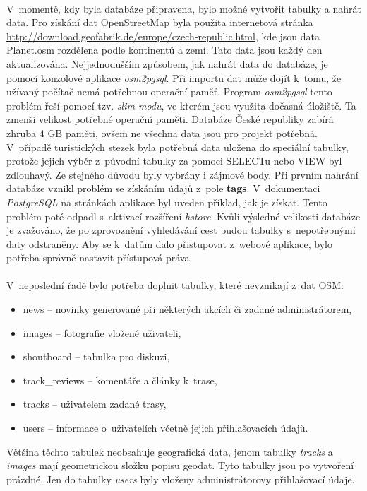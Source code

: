 \documentclass[11pt,a4paper,titlepage,oneside]{book}
\begin{document}
				\paragraph{} V~momentě, kdy byla databáze připravena, bylo možné vytvořit tabulky a nahrát data. Pro získání dat OpenStreetMap byla použita internetová stránka \url{http://download.geofabrik.de/europe/czech-republic.html}, kde jsou data Planet.osm rozdělena podle kontinentů a zemí. Tato data jsou každý den aktualizována. Nejjednodušším způsobem, jak nahrát data do databáze, je pomocí konzolové aplikace \textit{osm2pgsql}. Při importu dat může dojít k~tomu, že užívaný počítač nemá potřebnou operační paměť. Program \textit{osm2pgsql} tento problém řeší pomocí tzv. \textit{slim modu}, ve kterém jsou využita dočasná úložiště. Ta zmenší velikost potřebné operační paměti. Databáze České republiky zabírá zhruba 4 GB paměti, ovšem ne všechna data jsou pro projekt potřebná. V~případě turistických stezek byla potřebná data uložena do speciální tabulky, protože jejich výběr z~původní tabulky za pomoci SELECTu nebo VIEW byl zdlouhavý. Ze stejného důvodu byly vybrány i zájmové body. Při prvním nahrání databáze vznikl problém se získáním údajů z~pole \textbf{tags}. V~dokumentaci \textit{PostgreSQL} na stránkách aplikace byl uveden příklad, jak je získat. Tento problém poté odpadl s~aktivací rozšíření \textit{hstore}. Kvůli výsledné velikosti databáze je zvažováno, že po zprovoznění vyhledávání cest budou tabulky s~nepotřebnými daty odstraněny. Aby se k~datům dalo přistupovat z~webové aplikace, bylo potřeba správně nastavit přístupová práva.
				\paragraph{} V~neposlední řadě bylo potřeba doplnit tabulky, které nevznikají z~dat \acl{OSM}:
					\begin{itemize}
						\item news -- novinky generované při některých akcích či zadané administrá\-torem,
						\item images -- fotografie vložené uživateli,
						\item shoutboard -- tabulka pro diskuzi,
						\item track\_reviews -- komentáře a články k~trase,
						\item tracks -- uživatelem zadané trasy,
						\item users -- informace o~uživatelích včetně jejich přihlašovacích údajů.
					\end{itemize}
Většina těchto tabulek neobsahuje geografická data, jenom tabulky \textit{tracks} a \textit{images} mají geometrickou složku popisu geodat. Tyto tabulky jsou po vytvoření prázdné. Jen do tabulky \textit{users} byly vloženy administrátorovy přihlašovací údaje.
\end{document}
